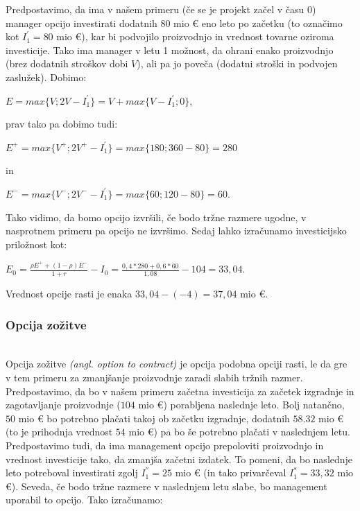 Predpostavimo, da ima v našem primeru (če se je projekt začel v času 0) manager opcijo investirati dodatnih $80$ mio € eno leto po začetku (to označimo kot $I^'_1 = 80$ mio €), kar bi podvojilo proizvodnjo in vrednost tovarne oziroma investicije. Tako ima manager v letu 1 možnost, da ohrani enako proizvodnjo (brez dodatnih stroškov dobi $V$), ali pa jo poveča (dodatni stroški in podvojen zaslužek). Dobimo:\\

 \begin{center}
$E = max\{V; 2V - I^'_1\} = V + max\{V - I^'_1; 0\}$,
\end{center}
prav tako pa dobimo tudi:\\
\begin{center}
$E^+ = max\{V^+; 2V^+ - I^'_1\} =  max\{180; 360 - 80\} = 280$
\end{center}
in
\begin{center}
$E^- = max\{V^-; 2V^- - I^'_1\} =  max\{60; 120 - 80\} = 60$.
\end{center}

Tako vidimo, da bomo opcijo izvršili, če bodo tržne razmere ugodne, v nasprotnem primeru pa opcijo ne izvršimo. Sedaj lahko izračunamo investicijsko priložnost kot:
\begin{center}
$E_0 = \tfrac{\rho E^+ + (1-\rho)E^-}{1+r} - I_0= \tfrac{0,4 * 280 + 0,6 * 60}{1,08} - 104 = 33,04 $.
\end{center}
Vrednost opcije rasti je enaka $33,04-(-4)=37,04$ mio €.\\

\subsubsection{Opcija zožitve}
\cite[str. 163, 164]{Trigeorgis}\\
Opcija zožitve \textit{(angl. option to contract)} je opcija podobna opciji rasti, le da gre v tem primeru za zmanjšanje proizvodnje zaradi slabih tržnih razmer. \\

Predpostavimo, da bo v našem primeru začetna investicija za začetek izgradnje in zagotavljanje proizvodnje ($104$ mio €) porabljena naslednje leto. Bolj natančno, $50$ mio € bo potrebno plačati takoj ob začetku izgradnje, dodatnih $58.32$ mio € (to je prihodnja vrednost $54$ mio €) pa bo še potrebno plačati v naslednjem letu. Predpostavimo tudi, da ima management opcijo  prepoloviti proizvodnjo in vrednost investicije tako, da zmanjša začetni izdatek. To pomeni, da bo naslednje leto potreboval investirati zgolj $I^{''}_1 = 25$ mio € (in tako privarčeval $I^*_1 = 33,32$ mio €). Seveda, če bodo tržne razmere v naslednjem letu slabe, bo management uporabil to opcijo. Tako izračunamo:\\

